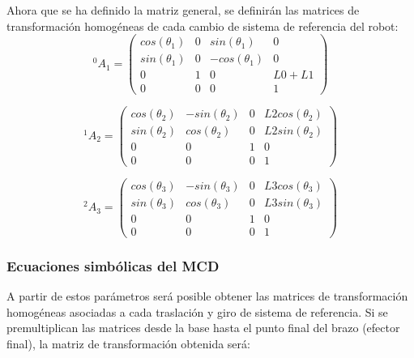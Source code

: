 Ahora que se ha definido la matriz general, se definirán las matrices de transformación homogéneas de cada cambio de sistema de referencia del robot: \\



\[ {^0}A_{1} =
\left( \begin{array}{cccc}

cos(\theta_{1}) &  0 &  sin(\theta_{1}) & 0  \\

sin(\theta_{1}) &  0 & -cos(\theta_{1}) & 0  \\

0		&  1 &		 0 			& L0+L1 \\

0		&  0 & 		 0			& 1
\end{array} \right) \]



\[ {^1}A_{2} =
\left( \begin{array}{cccc}

cos(\theta_{2}) & -sin(\theta_{2}) & 0 & L2cos(\theta_{2}) \\

sin(\theta_{2}) & cos(\theta_{2})  & 0 & L2sin(\theta_{2})  \\

0 		 	   & 			0 			& 1	& 		0 			 \\

0		 	   &			 0			& 0	& 		1
\end{array} \right) \]



\[ {^2}A_{3} =
\left( \begin{array}{cccc}

cos(\theta_{3}) &  -sin(\theta_{3}) &  0 & L3cos(\theta_{3})   \\

sin(\theta_{3}) &  cos(\theta_{3}) &  0 & L3sin(\theta_{3})   \\

0 					 &  0 &  				1 					  & 0 \\

0 					 &  0 & 				 0					  & 1
\end{array} \right) \]



\subsubsection{Ecuaciones simbólicas del MCD}

A partir de estos parámetros será posible obtener las matrices de transformación homogéneas asociadas a cada traslación y giro de sistema de referencia. Si se premultiplican las matrices desde la base hasta el punto final del brazo (efector final), la matriz de transformación obtenida será:

